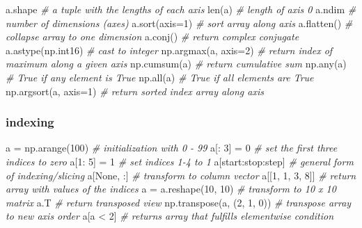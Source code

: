 \documentclass[]{article}
\newenvironment{Shaded}{}{}
\newcommand{\DataTypeTok}[1]{\textcolor[rgb]{0.56,0.13,0.00}{{#1}}}
\newcommand{\DecValTok}[1]{\textcolor[rgb]{0.25,0.63,0.44}{{#1}}}
\newcommand{\CommentTok}[1]{\textcolor[rgb]{0.38,0.63,0.69}{\textit{{#1}}}}
\newcommand{\OtherTok}[1]{\textcolor[rgb]{0.00,0.44,0.13}{{#1}}}
\newcommand{\NormalTok}[1]{{#1}}
\begin{document}
\begin{Shaded}
\begin{Highlighting}[]
\NormalTok{a.shape }\CommentTok{# a tuple with the lengths of each axis}
\DataTypeTok{len}\NormalTok{(a) }\CommentTok{# length of axis 0}
\NormalTok{a.ndim }\CommentTok{# number of dimensions (axes)}
\NormalTok{a.sort(axis=}\DecValTok{1}\NormalTok{) }\CommentTok{# sort array along axis}
\NormalTok{a.flatten() }\CommentTok{# collapse array to one dimension}
\NormalTok{a.conj() }\CommentTok{# return complex conjugate}
\NormalTok{a.astype(np.int16) }\CommentTok{# cast to integer}
\NormalTok{np.argmax(a, axis=}\DecValTok{2}\NormalTok{) }\CommentTok{# return index of maximum along a given axis}
\NormalTok{np.cumsum(a) }\CommentTok{# return cumulative sum}
\NormalTok{np.}\DataTypeTok{any}\NormalTok{(a) }\CommentTok{# True if any element is True}
\NormalTok{np.}\DataTypeTok{all}\NormalTok{(a) }\CommentTok{# True if all elements are True}
\NormalTok{np.argsort(a, axis=}\DecValTok{1}\NormalTok{) }\CommentTok{# return sorted index array along axis}
\end{Highlighting}
\end{Shaded}

\subsubsection{indexing}

\begin{Shaded}
\begin{Highlighting}[]
\NormalTok{a = np.arange(}\DecValTok{100}\NormalTok{) }\CommentTok{# initialization with 0 - 99}
\NormalTok{a[: }\DecValTok{3}\NormalTok{] = }\DecValTok{0} \CommentTok{# set the first three indices to zero}
\NormalTok{a[}\DecValTok{1}\NormalTok{: }\DecValTok{5}\NormalTok{] = }\DecValTok{1} \CommentTok{# set indices 1-4 to 1}
\NormalTok{a[start:stop:step] }\CommentTok{# general form of indexing/slicing}
\NormalTok{a[}\OtherTok{None}\NormalTok{, :] }\CommentTok{# transform to column vector}
\NormalTok{a[[}\DecValTok{1}\NormalTok{, }\DecValTok{1}\NormalTok{, }\DecValTok{3}\NormalTok{, }\DecValTok{8}\NormalTok{]] }\CommentTok{# return array with values of the indices}
\NormalTok{a = a.reshape(}\DecValTok{10}\NormalTok{, }\DecValTok{10}\NormalTok{) }\CommentTok{# transform to 10 x 10 matrix}
\NormalTok{a.T }\CommentTok{# return transposed view}
\NormalTok{np.transpose(a, (}\DecValTok{2}\NormalTok{, }\DecValTok{1}\NormalTok{, }\DecValTok{0}\NormalTok{)) }\CommentTok{# transpose array to new axis order}
\NormalTok{a[a < }\DecValTok{2}\NormalTok{] }\CommentTok{# returns array that fulfills elementwise condition}
\end{Highlighting}
\end{Shaded}
\end{document}
